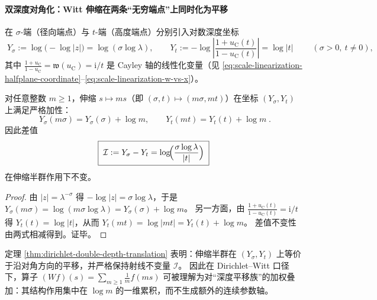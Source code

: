 \paragraph{双深度对角化：Witt 伸缩在两条“无穷端点”上同时化为平移}
在 \(\sigma\)-端（径向端点）与 \(t\)-端（高度端点）分别引入对数深度坐标
\begin{equation}\label{eq:dirichlet-double-depth-coordinates}
\boxed{\;
Y_{\sigma}:=\log\!\bigl(-\log|z|\bigr)=\log(\sigma\log\lambda),
\qquad
Y_{t}:=-\log\left|\frac{1+u_{\mathrm C}(t)}{1-u_{\mathrm C}(t)}\right|=\log|t|\; }
\qquad(\sigma>0,\ t\neq 0),
\end{equation}
其中 \(\frac{1+u_{\mathrm C}}{1-u_{\mathrm C}}=\mathfrak{w}(u_{\mathrm C})=\mathrm{i}/t\) 是 Cayley 轴的线性化变量（见 \eqref{eq:scale-linearization-halfplane-coordinate}--\eqref{eq:scale-linearization-w-vs-x}）。

\begin{theorem}[双深度平移律与射线不变量]\label{thm:dirichlet-double-depth-translation}
对任意整数 \(m\ge 1\)，伸缩 \(s\mapsto ms\)（即 \((\sigma,t)\mapsto(m\sigma,mt)\)）在坐标 \((Y_{\sigma},Y_{t})\) 上满足严格加性：
\begin{equation}\label{eq:dirichlet-double-depth-translation}
\boxed{\;
Y_{\sigma}(m\sigma)=Y_{\sigma}(\sigma)+\log m,
\qquad
Y_{t}(mt)=Y_{t}(t)+\log m\; }.
\end{equation}
因此差值
\begin{equation}\label{eq:dirichlet-ray-invariant}
\boxed{\;\mathcal{I}:=Y_{\sigma}-Y_{t}=\log\!\Bigl(\frac{\sigma\log\lambda}{|t|}\Bigr)\;}
\end{equation}
在伸缩半群作用下不变。
\end{theorem}
\begin{proof}
由 \(|z|=\lambda^{-\sigma}\) 得 \(-\log|z|=\sigma\log\lambda\)，于是
\(
Y_{\sigma}(m\sigma)=\log(m\sigma\log\lambda)=Y_{\sigma}(\sigma)+\log m
\)。
另一方面，由 \(\frac{1+u_{\mathrm C}(t)}{1-u_{\mathrm C}(t)}=\mathrm{i}/t\) 得 \(Y_t(t)=\log|t|\)，从而
\(
Y_{t}(mt)=\log|mt|=Y_{t}(t)+\log m
\)。
差值不变性由两式相减得到。证毕。
\end{proof}

\begin{remark}
定理 \ref{thm:dirichlet-double-depth-translation} 表明：伸缩半群在 \((Y_{\sigma},Y_t)\) 上等价于沿对角方向的平移，并严格保持射线不变量 \(\mathcal{I}\)。
因此在 Dirichlet--Witt 口径下，算子
\(
(Wf)(s)=\sum_{m\ge 1}\frac{1}{m}f(ms)
\)
可被理解为对“深度平移族”的加权叠加：其结构作用集中在 \(\log m\) 的一维累积，而不生成额外的连续参数轴。
\end{remark}

